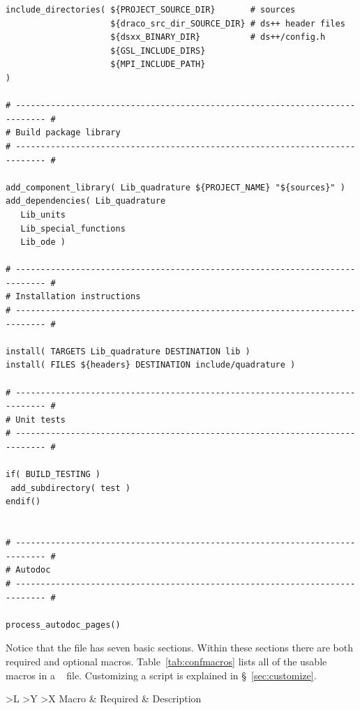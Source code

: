 \begin{description}
\begin{lstlisting}[basicstyle=\footnotesize, xleftmargin=0.0in, xrightmargin=0.0in,caption={\comp{CMakeLists.txt} file for the \pkg{quadrature} package.},label=lst:quadrature-cml,float=htp]
include_directories( ${PROJECT_SOURCE_DIR}       # sources
                     ${draco_src_dir_SOURCE_DIR} # ds++ header files
                     ${dsxx_BINARY_DIR}          # ds++/config.h
                     ${GSL_INCLUDE_DIRS}
                     ${MPI_INCLUDE_PATH}
)

# ---------------------------------------------------------------------------- #
# Build package library
# ---------------------------------------------------------------------------- #

add_component_library( Lib_quadrature ${PROJECT_NAME} "${sources}" )
add_dependencies( Lib_quadrature
   Lib_units
   Lib_special_functions
   Lib_ode )

# ---------------------------------------------------------------------------- #
# Installation instructions
# ---------------------------------------------------------------------------- #

install( TARGETS Lib_quadrature DESTINATION lib )
install( FILES ${headers} DESTINATION include/quadrature )

# ---------------------------------------------------------------------------- #
# Unit tests
# ---------------------------------------------------------------------------- #

if( BUILD_TESTING )
 add_subdirectory( test )
endif()   
  

# ---------------------------------------------------------------------------- #
# Autodoc
# ---------------------------------------------------------------------------- #

process_autodoc_pages()
\end{lstlisting}
  Notice that the  file has seven basic sections.  Within
  these sections there are both required and optional macros.
  Table~\ref{tab:confmacros} lists all of the usable macros in a
  \draco\  file.  Customizing a  script is explained 
  in \S~\ref{sec:customize}.
  \begin{table}
    \caption{Macros used by the  files.  Macros that require 
      arguments are indicated by \comp{()} following the macro name.}
    \label{tab:confmacros}
    \begin{center}
      \begin{tabularx}{\linewidth}{
          >{\setlength{\hsize}{.9\hsize}}L %
          >{\setlength{\hsize}{.3\hsize}}Y %
          >{\setlength{\hsize}{1.6\hsize}}X}
        \hline\hline
        {\normalfont Macro} & Required & Description\\ \hline
                               

\end{tabularx}
\end{center}
\end{table}
\end{description}
